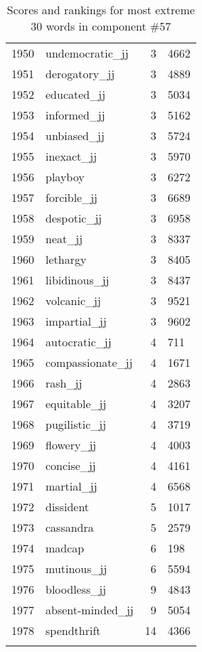 \begin{longtable}[!htbp]{| rlr@{.}l |}
    1950 & undemocratic\_jj & 3 & 4662 \\
    1951 & derogatory\_jj & 3 & 4889 \\
    1952 & educated\_jj & 3 & 5034 \\
    1953 & informed\_jj & 3 & 5162 \\
    1954 & unbiased\_jj & 3 & 5724 \\
    1955 & inexact\_jj & 3 & 5970 \\
    1956 & playboy & 3 & 6272 \\
    1957 & forcible\_jj & 3 & 6689 \\
    1958 & despotic\_jj & 3 & 6958 \\
    1959 & neat\_jj & 3 & 8337 \\
    1960 & lethargy & 3 & 8405 \\
    1961 & libidinous\_jj & 3 & 8437 \\
    1962 & volcanic\_jj & 3 & 9521 \\
    1963 & impartial\_jj & 3 & 9602 \\
    1964 & autocratic\_jj & 4 & 711 \\
    1965 & compassionate\_jj & 4 & 1671 \\
    1966 & rash\_jj & 4 & 2863 \\
    1967 & equitable\_jj & 4 & 3207 \\
    1968 & pugilistic\_jj & 4 & 3719 \\
    1969 & flowery\_jj & 4 & 4003 \\
    1970 & concise\_jj & 4 & 4161 \\
    1971 & martial\_jj & 4 & 6568 \\
    1972 & dissident & 5 & 1017 \\
    1973 & cassandra & 5 & 2579 \\
    1974 & madcap & 6 & 198 \\
    1975 & mutinous\_jj & 6 & 5594 \\
    1976 & bloodless\_jj & 9 & 4843 \\
    1977 & absent-minded\_jj & 9 & 5054 \\
    1978 & spendthrift & 14 & 4366 \\
    \hline
    \caption{Scores and rankings for most extreme 30 words in component \#57} \\
\end{longtable}
